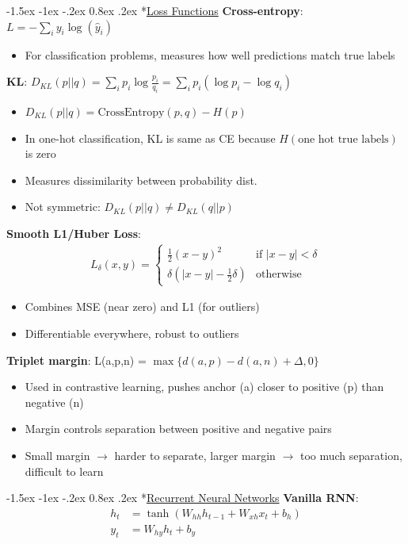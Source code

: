 \documentclass{article}
\makeatletter
\renewcommand\section{\@startsection{section}{1}{\z@}%
                                  {-1.5ex \@plus -1ex \@minus -.2ex}%
                                  {0.8ex \@plus.2ex}%
                                  {\normalfont\small\bfseries}}
\makeatother
\begin{document}
\begin{multicols}{3}
\section*{\underline{Loss Functions}}
\textbf{Cross-entropy}: $L = -\sum_i y_i \log(\hat{y}_i)$
\begin{itemize}
\item For classification problems, measures how well predictions match true labels
\end{itemize}

\textbf{KL}: $D_{KL}(p||q) = \sum_i p_i \log\frac{p_i}{q_i} = \sum_i p_i(\log p_i - \log q_i)$
\begin{itemize}
\item $D_{KL}(p||q) = \text{CrossEntropy}(p, q) - H(p)$
\item In one-hot classification, KL is same as CE because $H(\text{one hot true labels})$ is zero
\item Measures dissimilarity between probability dist.
\item Not symmetric: $D_{KL}(p||q) \neq D_{KL}(q||p)$
\end{itemize}

\textbf{Smooth L1/Huber Loss}:
\begin{align*}
L_{\delta}(x, y) = \begin{cases}
\frac{1}{2}(x-y)^2 & \text{if } |x-y| < \delta \\
\delta(|x-y| - \frac{1}{2}\delta) & \text{otherwise}
\end{cases}
\end{align*}
\begin{itemize}
\item Combines MSE (near zero) and L1 (for outliers)
\item Differentiable everywhere, robust to outliers
\end{itemize}

\textbf{Triplet margin}: L(a,p,n) = $\max\{d(a,p) - d(a,n) + \Delta, 0\}$
\begin{itemize}
\item Used in contrastive learning, pushes anchor (a) closer to positive (p) than negative (n)
\item Margin controls separation between positive and negative pairs
\item Small margin $\rightarrow$ harder to separate, larger margin $\rightarrow$ too much separation, difficult to learn
\end{itemize}

\section*{\underline{Recurrent Neural Networks}}
\textbf{Vanilla RNN}:
\begin{align*}
h_t &= \tanh(W_{hh}h_{t-1} + W_{xh}x_t + b_h)\\
y_t &= W_{hy}h_t + b_y
\end{align*}


\end{multicols}
\end{document}
